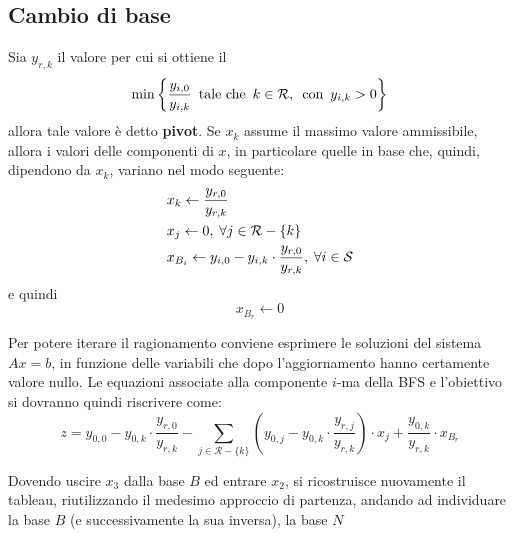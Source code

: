 \documentclass[a4paper]{extarticle}
\begin{document}
\subsection{Cambio di base}
Sia $y_{r,k}$ il valore per cui si ottiene il 
\[\min \left\{\frac{y_{i,0}}{y_{i,k}} \hspace{0.5em} \text{tale che} \hspace{0.5em} k \in \mathcal{R}, \hspace{0.5em} \text{con} \hspace{0.5em} y_{i,k} > 0\right\}\]
allora tale valore è detto \textbf{pivot}. Se $x_k$ assume il massimo valore ammissibile, allora i valori delle componenti di $x$, in particolare quelle in base che, quindi, dipendono da $x_k$, variano nel modo seguente:
\begin{align*}
    &x_k \leftarrow \dfrac{y_{r,0}}{y_{r,k}}\\
    &x_j \leftarrow 0, \hspace{0.25em} \forall j \in \mathcal{R}-\{k\}\\
    &x_{B_i} \leftarrow y_{i,0}-y_{i,k} \cdot \dfrac{y_{r,0}}{y_{r,k}}, \hspace{0.25em} \forall i \in \mathcal{S}
\end{align*}
e quindi
\[x_{B_r} \leftarrow 0\]

\vspace{1em}
\noindent
Per potere iterare il ragionamento conviene esprimere le soluzioni del sistema $Ax = b$, in funzione delle variabili che dopo l'aggiornamento hanno certamente valore nullo. Le equazioni associate alla componente $i$-ma della BFS e l'obiettivo si dovranno quindi riscrivere come:
\[z=y_{0,0}-y_{0,k} \cdot \frac{y_{r,0}}{y_{r,k}} - \sum_{j \in \mathcal{R} - \{k\}} \left(y_{0,j}-y_{0,k} \cdot \frac{y_{r,j}}{y_{r,k}}\right) \cdot x_j + \frac{y_{0,k}}{y_{r,k}} \cdot x_{B_r}\]


\vspace{1em}
\noindent
Dovendo uscire $x_3$ dalla base $B$ ed entrare $x_2$, si ricostruisce nuovamente il tableau, riutilizzando il medesimo approccio di partenza, andando ad individuare la base $B$ (e successivamente la sua inversa), la base $N$
\end{document}
